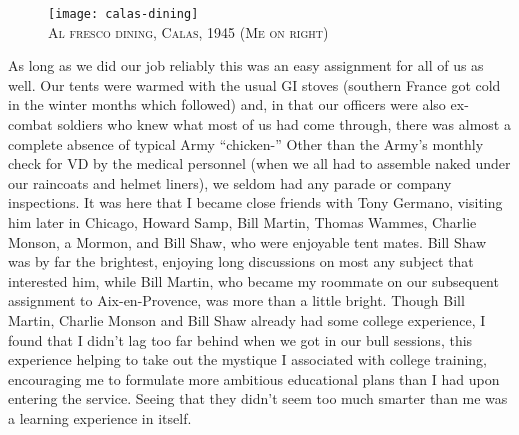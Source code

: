 \documentclass[../m3y]{subfiles}
\begin{document}
\begin{figure}
\centering
\texttt{[image: calas-dining]}\\
\medskip
{\newtimes\textsc{Al fresco dining, Calas, 1945 (Me on right)}}
\end{figure}

As long as we did our job reliably this was an easy assignment for all of us as well. Our tents were warmed with the usual GI stoves (southern France got cold in the winter months which followed) and, in that our officers were also ex-combat soldiers who knew what most of us had come through, there was almost a complete absence of typical Army ``chicken-\underline{\hspace{4em}}'' Other than the Army's monthly check for VD by the medical personnel (when we all had to assemble naked under our raincoats and helmet liners), we seldom had any parade or company inspections. It was here that I became close friends with Tony Germano, visiting him later in Chicago, Howard Samp, Bill Martin, Thomas Wammes, Charlie Monson, a Mormon, and Bill Shaw, who were enjoyable tent mates. Bill Shaw was by far the brightest, enjoying long discussions on most any subject that interested him, while Bill Martin, who became my roommate on our subsequent  assignment to Aix-en-Provence, was more than a little bright. Though Bill Martin, Charlie Monson and Bill Shaw already had some college experience, I found that I didn't lag too far behind when we got in our bull sessions, this experience helping to take out the mystique I associated with college training, encouraging me to formulate more ambitious educational plans than I had upon entering the service. Seeing that they didn't seem too much smarter than me was a learning experience in itself.
\end{document}

